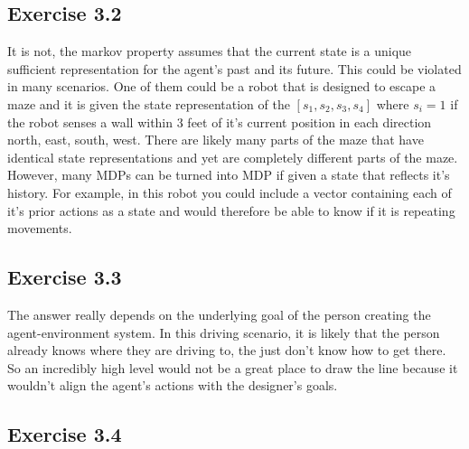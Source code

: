 \subsection{Exercise 3.2}
It is not, the markov property assumes that the current state is a unique sufficient representation for the agent's past and its future. This could be violated in many scenarios. One of them could be a robot that is designed to escape a maze and it is given the state representation of the $[s_1,s_2,s_3,s_4]$ where $s_i = 1$ if the robot senses a wall within 3 feet of it's current position in each direction north, east, south, west. There are likely many parts of the maze that have identical state representations and yet are completely different parts of the maze. However, many MDPs can be turned into MDP if given a state that reflects it's history. For example, in this robot you could include a vector containing each of it's prior actions as a state and would therefore be able to know if it is repeating movements.

\subsection{Exercise 3.3}
The answer really depends on the underlying goal of the person creating the agent-environment system. In this driving scenario, it is likely that the person already knows where they are driving to, the just don't know how to get there. So an incredibly high level would not be a great place to draw the line because it wouldn't align the agent's actions with the designer's goals. 

\subsection{Exercise 3.4}

